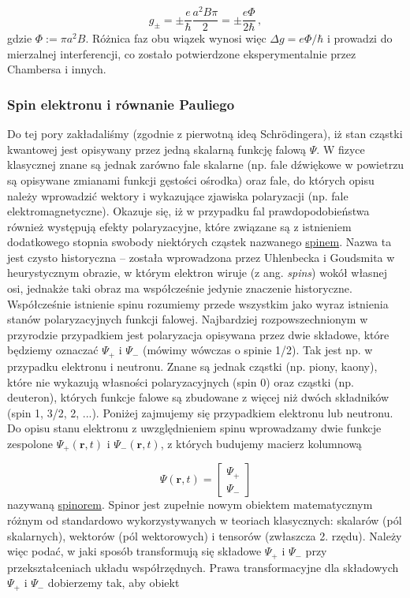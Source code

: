 \documentclass{myclass}
\begin{document}
\begin{equation*}
g_{\pm}=\pm\frac{e}{\hbar}\frac{a^2B\pi}{2}=\pm\frac{e\Phi}{2\hbar}\,,
\end{equation*}
gdzie \(\Phi:=\pi a^2B\). Różnica faz obu wiązek wynosi więc \(\Delta g=e\Phi/\hbar\) i prowadzi do
mierzalnej interferencji, co zostało potwierdzone eksperymentalnie przez Chambersa i innych.

\subsubsection{Spin elektronu i równanie Pauliego}

Do tej pory zakładaliśmy (zgodnie z pierwotną ideą Schr{\"o}dingera), iż stan cząstki kwantowej jest
opisywany przez jedną skalarną funkcję falową \(\Psi\). W fizyce klasycznej znane są jednak zarówno
fale skalarne (np. fale dźwiękowe w powietrzu są opisywane zmianami funkcji gęstości ośrodka) oraz
fale, do których opisu należy wprowadzić wektory i wykazujące zjawiska polaryzacji (np. fale
elektromagnetyczne). Okazuje się, iż w przypadku fal prawdopodobieństwa również występują efekty
polaryzacyjne, które związane są z istnieniem dodatkowego stopnia swobody niektórych cząstek
nazwanego \underline{spinem}. Nazwa ta jest czysto historyczna -- została wprowadzona przez
Uhlenbecka i Goudsmita w heurystycznym obrazie, w którym elektron wiruje (z ang. \textit{spins})
wokół własnej osi, jednakże taki obraz ma współcześnie jedynie znaczenie historyczne.\\

Współcześnie istnienie spinu rozumiemy przede wszystkim jako wyraz istnienia stanów polaryzacyjnych
funkcji falowej. Najbardziej rozpowszechnionym w przyrodzie przypadkiem jest polaryzacja opisywana
przez dwie składowe, które będziemy oznaczać \(\Psi_+\) i \(\Psi_-\) (mówimy wówczas o spinie 1/2).
Tak jest np. w przypadku elektronu i neutronu. Znane są jednak cząstki (np. piony, kaony), które nie
wykazują własności polaryzacyjnych (spin 0) oraz cząstki (np. deuteron), których funkcje falowe są
zbudowane z więcej niż dwóch składników (spin 1, 3/2, 2, ...). Poniżej zajmujemy się przypadkiem
elektronu lub neutronu.\\

Do opisu stanu elektronu z uwzględnieniem spinu wprowadzamy dwie funkcje zespolone
\(\Psi_+(\mathbf{r},t)\) i \(\Psi_-(\mathbf{r},t)\), z których budujemy macierz kolumnową

\begin{equation*}
\mathsf{\Psi}(\mathbf{r},t)=\begin{bmatrix}
\Psi_+\\
\Psi_-
\end{bmatrix}
\end{equation*}
nazywaną \underline{spinorem}. Spinor jest zupełnie nowym obiektem matematycznym różnym od
standardowo wykorzystywanych w teoriach klasycznych: skalarów (pól skalarnych), wektorów (pól
wektorowych) i tensorów (zwłaszcza 2. rzędu). Należy więc podać, w jaki sposób transformują się
składowe \(\Psi_+\) i \(\Psi_-\) przy przekształceniach układu współrzędnych. Prawa transformacyjne
dla składowych \(\Psi_+\) i \(\Psi_-\) dobierzemy tak, aby obiekt
\end{document}
